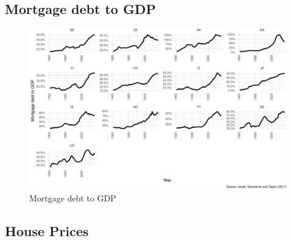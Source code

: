 \documentclass[
]{book}
\begin{document}
\hypertarget{sec:fi-fl-sfc-Ap-A-MtoGDP}{%
\subsection{Mortgage debt to GDP}\label{sec:fi-fl-sfc-Ap-A-MtoGDP}}

\begin{figure}
\centering
\includegraphics{figures/fl-fi-sfc-hh-debt-1.pdf}
\caption{\label{fig:fl-fi-sfc-hh-debt}Mortgage debt to GDP}
\end{figure}

\hypertarget{sec:fi-fl-sfc-Ap-A-OECD-house-prices}{%
\subsection{House Prices}\label{sec:fi-fl-sfc-Ap-A-OECD-house-prices}}
\end{document}
